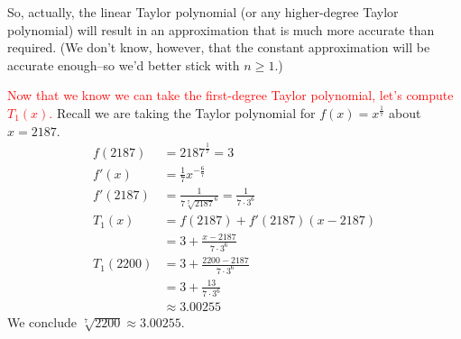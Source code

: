 \begin{solution}
So, actually, the linear Taylor polynomial (or any higher-degree Taylor polynomial) will result in an approximation that is much more accurate than required. (We don't know, however, that the constant approximation will be accurate enough--so we'd better stick with $n \geq 1$.)

\textcolor{red}{Now that we know we can take the first-degree Taylor polynomial, let's compute $T_1(x)$.} Recall we are taking the Taylor polynomial for $f(x)=x^{\tfrac{1}{7}}$ about $x=2187$.
\begin{align*}
f(2187)&=2187^{\tfrac{1}{7}}=3\\
f'(x)&=\frac{1}{7}x^{-\tfrac{6}{7}}\\
f'(2187)&=\frac{1}{7\sqrt[7]{2187}^6}=\frac{1}{7\cdot3^6}\\
T_1(x)&=f(2187)+f'(2187)(x-2187)\\
&=3+\frac{x-2187}{7\cdot3^6}\\
T_1(2200)&=3+\frac{2200-2187}{7\cdot3^6}\\
&=3+\frac{13}{7\cdot 3^6}\\
&\approx 3.00255
\end{align*}
We conclude $\sqrt[7]{2200}\approx 3.00255$.
\end{solution}


